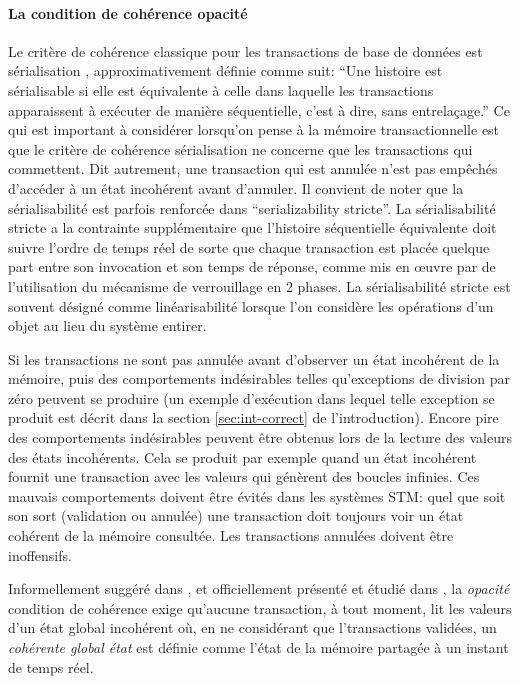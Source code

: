 \paragraph {La condition de cohérence opacité}
Le critère de cohérence classique pour les transactions de base de données est sérialisation \cite{P79}, approximativement définie comme suit:
``Une histoire est sérialisable si elle est équivalente à celle dans laquelle les transactions apparaissent à exécuter de manière séquentielle, c'est à dire, sans entrelaçage.''
Ce qui est important à considérer lorsqu'on pense à la mémoire transactionnelle est que le critère de cohérence sérialisation ne concerne que les transactions qui commettent.
Dit autrement, une transaction qui est annulée n'est pas empêchés d'accéder à un état incohérent avant d'annuler.
Il convient de noter que la sérialisabilité est parfois renforcée dans ``serializability stricte''.
La sérialisabilité stricte a la contrainte supplémentaire que l'histoire séquentielle équivalente doit suivre l'ordre de temps réel
de sorte que chaque transaction est placée quelque part entre son invocation et son temps de réponse, comme mis en œuvre par de l'utilisation du mécanisme de verrouillage en 2 phases.
La sérialisabilité stricte est souvent désigné comme linéarisabilité \cite{HW90} lorsque l'on considère les opérations d'un objet au lieu du système entirer.


Si les transactions ne sont pas annulée avant d'observer un état incohérent de la mémoire,
puis des comportements indésirables telles qu'exceptions de division par zéro peuvent se produire
(un exemple d'exécution dans lequel telle exception se produit est décrit dans la section \ref{sec:int-correct} de l'introduction).
Encore pire des comportements indésirables peuvent être obtenus lors de la lecture des valeurs des états incohérents.
Cela se produit par exemple quand un état incohérent fournit une transaction avec les valeurs qui génèrent des boucles infinies.
Ces mauvais comportements doivent être évités dans les systèmes STM:
quel que soit son sort (validation ou annulée) une transaction doit toujours voir un état cohérent de la mémoire consultée.
Les transactions annulées doivent être inoffensifs.




Informellement suggéré dans \cite{DSS06}, et officiellement présenté et étudié dans \cite{GK08},
la {\it opacité} condition de cohérence exige qu'aucune transaction, à tout moment, lit les valeurs d'un état global incohérent où,
en ne considérant que l'transactions validées, un {\it cohérente global état} est définie comme l'état de la mémoire partagée à un instant de temps réel.





